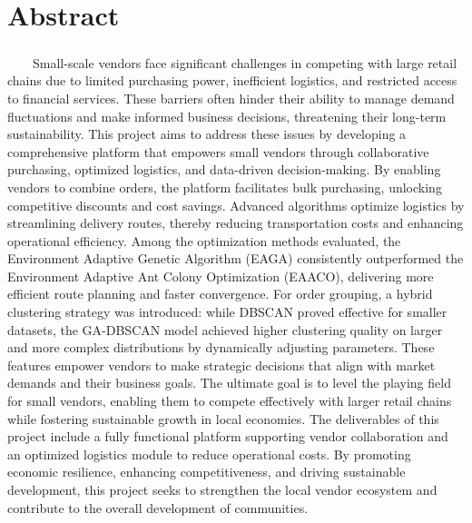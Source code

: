 \chapter*{Abstract}
\vspace{1.5cm}
\paragraph{}\ \ \ \ Small-scale vendors face significant challenges in competing with large retail chains due to limited purchasing power, inefficient logistics, and restricted access to financial services. These barriers often hinder their ability to manage demand fluctuations and make informed business decisions, threatening their long-term sustainability. This project aims to address these issues by developing a comprehensive platform that empowers small vendors through collaborative purchasing, optimized logistics, and data-driven decision-making. By enabling vendors to combine orders, the platform facilitates bulk purchasing, unlocking competitive discounts and cost savings. Advanced algorithms optimize logistics by streamlining delivery routes, thereby reducing transportation costs and enhancing operational efficiency. Among the optimization methods evaluated, the Environment Adaptive Genetic Algorithm (EAGA) consistently outperformed the Environment Adaptive Ant Colony Optimization (EAACO), delivering more efficient route planning and faster convergence. For order grouping, a hybrid clustering strategy was introduced: while DBSCAN proved effective for smaller datasets, the GA-DBSCAN model achieved higher clustering quality on larger and more complex distributions by dynamically adjusting parameters. These features empower vendors to make strategic decisions that align with market demands and their business goals. The ultimate goal is to level the playing field for small vendors, enabling them to compete effectively with larger retail chains while fostering sustainable growth in local economies. The deliverables of this project include a fully functional platform supporting vendor collaboration and an optimized logistics module to reduce operational costs. By promoting economic resilience, enhancing competitiveness, and driving sustainable development, this project seeks to strengthen the local vendor ecosystem and contribute to the overall development of communities.